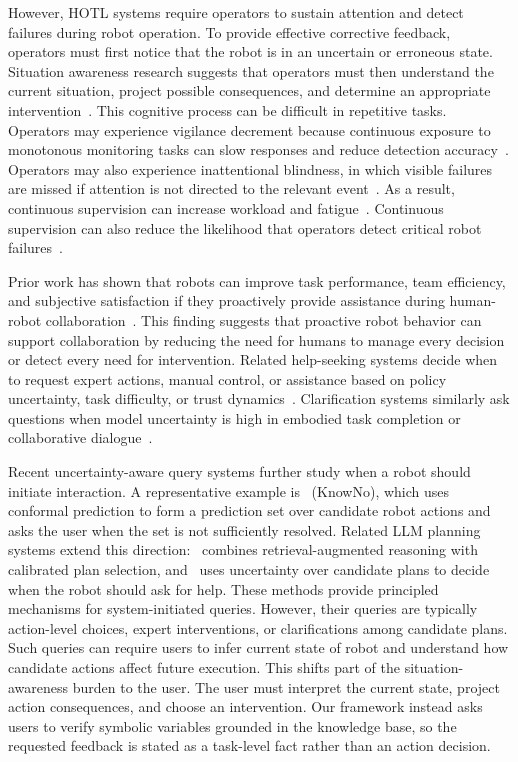 However, HOTL systems require operators to sustain attention and detect failures during robot operation. To provide effective corrective feedback, operators must first notice that the robot is in an uncertain or erroneous state. Situation awareness research suggests that operators must then understand the current situation, project possible consequences, and determine an appropriate intervention~\cite{endsley2018automation}. This cognitive process can be difficult in repetitive tasks. Operators may experience vigilance decrement because continuous exposure to monotonous monitoring tasks can slow responses and reduce detection accuracy~\cite{davies1982psychology, davies2013human}. Operators may also experience inattentional blindness, in which visible failures are missed if attention is not directed to the relevant event~\cite{mack2003inattentional}. As a result, continuous supervision can increase workload and fatigue~\cite{wong2017workload}. Continuous supervision can also reduce the likelihood that operators detect critical robot failures~\cite{wong2017workload, galster2006managing}.


Prior work has shown that robots can improve task performance, team efficiency, and subjective satisfaction if they proactively provide assistance during human-robot collaboration~\cite{baraglia2017efficient}. This finding suggests that proactive robot behavior can support collaboration by reducing the need for humans to manage every decision or detect every need for intervention. Related help-seeking systems decide when to request expert actions, manual control, or assistance based on policy uncertainty, task difficulty, or trust dynamics~\cite{singi2024decision,igbinedion2024learning,zhao2025conformalized,mangalindan2025seek}. Clarification systems similarly ask questions when model uncertainty is high in embodied task completion or collaborative dialogue~\cite{shen2025elba,testoni2024asking}.


Recent uncertainty-aware query systems further study when a robot should initiate interaction. A representative example is~\cite{ren2023robots} (KnowNo), which uses conformal prediction to form a prediction set over candidate robot actions and asks the user when the set is not sufficiently resolved. Related LLM planning systems extend this direction:~\cite{liang2024introspective} combines retrieval-augmented reasoning with calibrated plan selection, and~\cite{mullen2025lbap} uses uncertainty over candidate plans to decide when the robot should ask for help. These methods provide principled mechanisms for system-initiated queries. However, their queries are typically action-level choices, expert interventions, or clarifications among candidate plans. Such queries can require users to infer current state of robot and understand how candidate actions affect future execution. This shifts part of the situation-awareness burden to the user. The user must interpret the current state, project action consequences, and choose an intervention. Our framework instead asks users to verify symbolic variables grounded in the knowledge base, so the requested feedback is stated as a task-level fact rather than an action decision.


